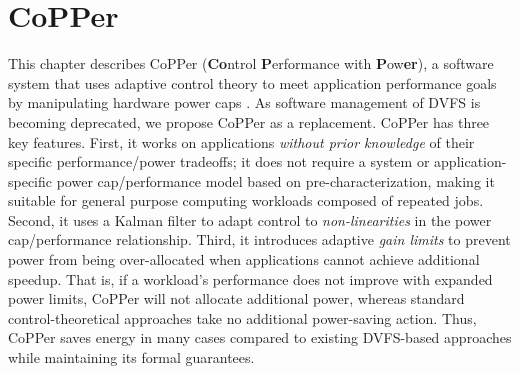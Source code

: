 \chapter{CoPPer}
\label{sec:copper}

This chapter describes CoPPer (\textbf{Co}ntrol \textbf{P}erf\-ormance with \textbf{P}ow\textbf{er}), a software system that uses adaptive control theory to meet application performance goals by manipulating hardware power caps \cite{CopperTR}.
As software management of DVFS is becoming deprecated, we propose CoPPer as a replacement.
CoPPer has three key features.
First, it works on applications \emph{without prior knowledge} of their specific performance/power tradeoffs; \ie it does not require a system or application-specific power cap/performance model based on pre-characterization, making it suitable for general purpose computing workloads composed of repeated jobs.
Second, it uses a Kalman filter to adapt control to \emph{non-linearities} in the power cap/performance relationship.
Third, it introduces adaptive \emph{gain limits} to prevent power from being over-allocated when applications cannot achieve additional speedup.
That is, if a workload's performance does not improve with expanded power limits, CoPPer will not allocate additional power, whereas standard control-theoretical approaches take no additional power-saving action.
Thus, CoPPer saves energy in many cases compared to existing DVFS-based approaches while maintaining its formal guarantees.






